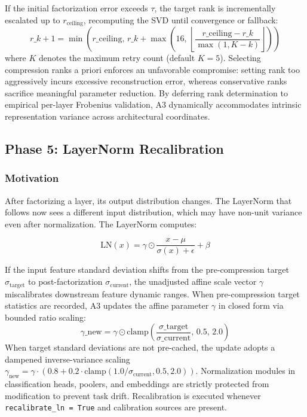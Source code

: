If the initial factorization error exceeds $\tau$, the target rank is incrementally escalated up to $r_{\mathrm{ceiling}}$, recomputing the SVD until convergence or fallback:
\[
r\_{k+1} = \min\!\left(r\_{\mathrm{ceiling}},\, r\_k + \max\!\left(16,\, \left\lfloor\frac{r\_{\mathrm{ceiling}} - r\_k}{\max(1, K - k)}\right\rfloor\right)\right)
\tag{4.11}
\]
where $K$ denotes the maximum retry count (default $K=5$). Selecting compression ranks a priori enforces an unfavorable compromise: setting rank too aggressively incurs excessive reconstruction error, whereas conservative ranks sacrifice meaningful parameter reduction. By deferring rank determination to empirical per-layer Frobenius validation, A3 dynamically accommodates intrinsic representation variance across architectural coordinates.

\subsection{Phase 5: LayerNorm Recalibration}
\label{sec:layernorm_recalibration}

\subsubsection{Motivation}

After factorizing a layer, its output distribution changes. The LayerNorm 
that follows now sees a different input distribution, which may have 
non-unit variance even after normalization. The LayerNorm computes:

\[
\text{LN}(x) = \gamma \odot \frac{x - \mu}{\sigma(x) + \epsilon} + \beta
\tag{4.12}
\]

If the input feature standard deviation shifts from the pre-compression target $\sigma_{\mathrm{target}}$ to post-factorization $\sigma_{\mathrm{current}}$, the unadjusted affine scale vector $\gamma$ miscalibrates downstream feature dynamic ranges. When pre-compression target statistics are recorded, A3 updates the affine parameter $\gamma$ in closed form via bounded ratio scaling:
\[
\gamma\_{\mathrm{new}} = \gamma \odot \mathrm{clamp}\!\left(\frac{\sigma\_{\mathrm{target}}}{\sigma\_{\mathrm{current}}},\, 0.5,\, 2.0\right)
\tag{4.13}
\]
When target standard deviations are not pre-cached, the update adopts a dampened inverse-variance scaling $\gamma_{\mathrm{new}} = \gamma \cdot (0.8 + 0.2 \cdot \mathrm{clamp}(1.0/\sigma_{\mathrm{current}}, 0.5, 2.0))$. Normalization modules in classification heads, poolers, and embeddings are strictly protected from modification to prevent task drift. Recalibration is executed whenever \texttt{recalibrate\_ln = True} and calibration sources are present.

